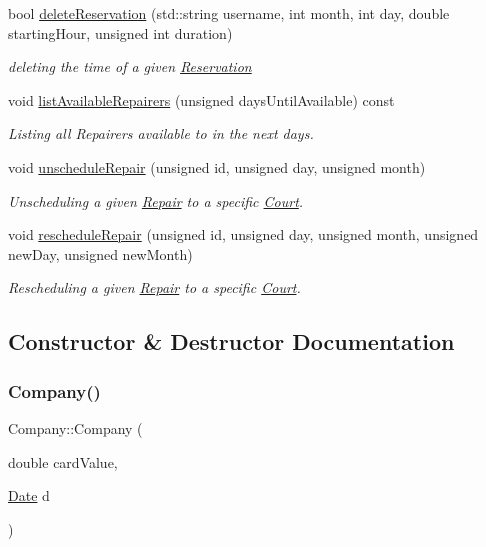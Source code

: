 \begin{DoxyCompactItemize}
$$bool \mbox{\hyperlink{class_company_ad6819fd8a928fd10123ad24ca640325c}{delete\+Reservation}} (std\+::string username, int month, int day, double starting\+Hour, unsigned int duration)
\begin{DoxyCompactList}\small\item\em deleting the time of a given \mbox{\hyperlink{class_reservation}{Reservation}} \end{DoxyCompactList}\item 
void \mbox{\hyperlink{class_company_a12366416c26ae1d5046695261374f440}{list\+Available\+Repairers}} (unsigned days\+Until\+Available) const
\begin{DoxyCompactList}\small\item\em Listing all Repairers available to in the next days. \end{DoxyCompactList}\item 
void \mbox{\hyperlink{class_company_a64817eefb5be8a9d23af9e0f651b7f71}{unschedule\+Repair}} (unsigned id, unsigned day, unsigned month)
\begin{DoxyCompactList}\small\item\em Unscheduling a given \mbox{\hyperlink{class_repair}{Repair}} to a specific \mbox{\hyperlink{class_court}{Court}}. \end{DoxyCompactList}\item 
void \mbox{\hyperlink{class_company_aaab5975d45b94e576be7fe6b8d0e73e5}{reschedule\+Repair}} (unsigned id, unsigned day, unsigned month, unsigned new\+Day, unsigned new\+Month)
\begin{DoxyCompactList}\small\item\em Rescheduling a given \mbox{\hyperlink{class_repair}{Repair}} to a specific \mbox{\hyperlink{class_court}{Court}}. \end{DoxyCompactList}\end{DoxyCompactItemize}


\subsection{Constructor \& Destructor Documentation}
\mbox{\label{class_company_ac038a4c5e02f13a7bab9b5139990316e}} 
\subsubsection{\texorpdfstring{Company()}{Company()}}
{\footnotesize\ttfamily Company\+::\+Company (\begin{DoxyParamCaption}\item[{double}]{card\+Value,  }\item[{\mbox{\hyperlink{class_date}{Date}}}]{d }\end{DoxyParamCaption})}



